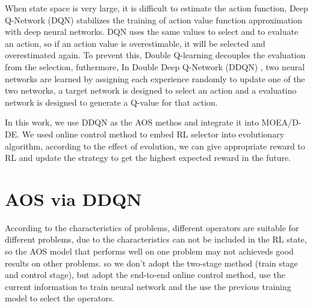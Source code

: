 \documentclass[journal]{IEEEtran}
\begin{document}
When state space is very large, it is difficult to estimate the action function, Deep Q-Network (DQN) \cite{mnih2015human} stabilizes the training of action value function approximation with deep neural networks.
DQN uses the same values to select and to evaluate an action, so if an action value is overestimable, it will be selected and overestimated again. To prevent this, Double Q-learning \cite{hasselt2010double} decouples the evaluation from the selection, futhermore, In Double Deep Q-Network (DDQN) \cite{ddqn}, two neural networks are learned by assigning each experience randomly to update one of the two networks, a target network is designed to select an action and a evaluatino network is designed to generate a Q-value for that action.

In this work, we use DDQN as the AOS methos and integrate it into MOEA/D-DE.
We used online control method to embed RL selector into evolutionary algorithm,
according to the effect of evolution, we can give appropriate reward to RL and update the strategy to get the highest expected reward in the future.



\section{AOS via DDQN}
% 
According to the characteristics of problems, different operators are suitable for different problems, due to the characteristics can not be included in the RL state, so the AOS model that performs well on one problem may not achieveds good results on other problems.
so we don't adopt the two-stage method (train stage and control stage), but adopt the end-to-end online control method, use the current information to train neural network and the use the previous training model to select the operators.
\end{document}
